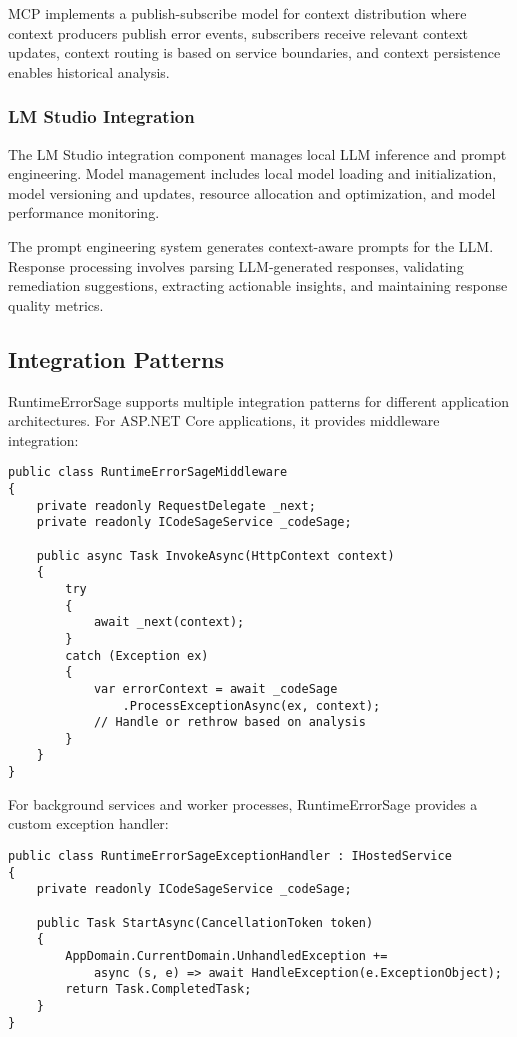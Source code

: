 MCP implements a publish-subscribe model for context distribution where context producers publish error events, subscribers receive relevant context updates, context routing is based on service boundaries, and context persistence enables historical analysis.

\subsubsection{LM Studio Integration}
The LM Studio integration component manages local LLM inference and prompt engineering. Model management includes local model loading and initialization, model versioning and updates, resource allocation and optimization, and model performance monitoring.

The prompt engineering system generates context-aware prompts for the LLM. Response processing involves parsing LLM-generated responses, validating remediation suggestions, extracting actionable insights, and maintaining response quality metrics.

\subsection{Integration Patterns}
RuntimeErrorSage supports multiple integration patterns for different application architectures. For ASP.NET Core applications, it provides middleware integration:

\begin{lstlisting}[style=csharpstyle,caption={ASP.NET Core Middleware Integration},label=lst:middleware-architecture]
public class RuntimeErrorSageMiddleware
{
    private readonly RequestDelegate _next;
    private readonly ICodeSageService _codeSage;

    public async Task InvokeAsync(HttpContext context)
    {
        try
        {
            await _next(context);
        }
        catch (Exception ex)
        {
            var errorContext = await _codeSage
                .ProcessExceptionAsync(ex, context);
            // Handle or rethrow based on analysis
        }
    }
}
\end{lstlisting}

For background services and worker processes, RuntimeErrorSage provides a custom exception handler:

\begin{lstlisting}[style=csharpstyle,caption={Background Service Integration},label=lst:background]
public class RuntimeErrorSageExceptionHandler : IHostedService
{
    private readonly ICodeSageService _codeSage;
    
    public Task StartAsync(CancellationToken token)
    {
        AppDomain.CurrentDomain.UnhandledException += 
            async (s, e) => await HandleException(e.ExceptionObject);
        return Task.CompletedTask;
    }
}
\end{lstlisting}

